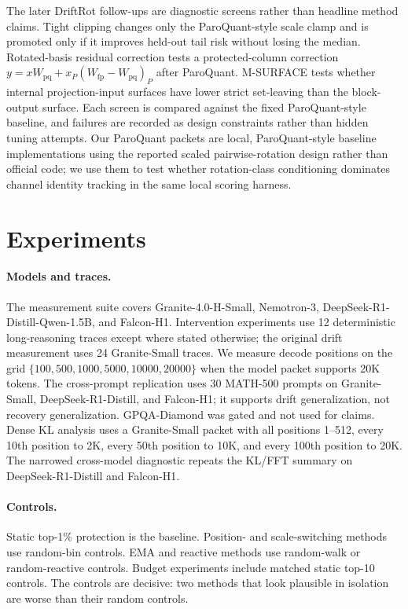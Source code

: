 \documentclass{article}
\begin{document}
The later DriftRot follow-ups are diagnostic screens rather than headline method claims. Tight clipping changes only the ParoQuant-style scale clamp and is promoted only if it improves held-out tail risk without losing the median. Rotated-basis residual correction tests a protected-column correction $y=xW_{\mathrm{pq}}+x_P(W_{\mathrm{fp}}-W_{\mathrm{pq}})_P$ after ParoQuant. M-SURFACE tests whether internal projection-input surfaces have lower strict set-leaving than the block-output surface. Each screen is compared against the fixed ParoQuant-style baseline, and failures are recorded as design constraints rather than hidden tuning attempts. Our ParoQuant packets are local, ParoQuant-style baseline implementations using the reported scaled pairwise-rotation design rather than official code; we use them to test whether rotation-class conditioning dominates channel identity tracking in the same local scoring harness.

\section{Experiments}

\paragraph{Models and traces.} The measurement suite covers Granite-4.0-H-Small, Nemotron-3, DeepSeek-R1-Distill-Qwen-1.5B, and Falcon-H1. Intervention experiments use 12 deterministic long-reasoning traces except where stated otherwise; the original drift measurement uses 24 Granite-Small traces. We measure decode positions on the grid $\{100,500,1000,5000,10000,20000\}$ when the model packet supports 20K tokens. The cross-prompt replication uses 30 MATH-500 prompts on Granite-Small, DeepSeek-R1-Distill, and Falcon-H1; it supports drift generalization, not recovery generalization. GPQA-Diamond was gated and not used for claims. Dense KL analysis uses a Granite-Small packet with all positions 1--512, every 10th position to 2K, every 50th position to 10K, and every 100th position to 20K. The narrowed cross-model diagnostic repeats the KL/FFT summary on DeepSeek-R1-Distill and Falcon-H1.

\paragraph{Controls.} Static top-1\% protection is the baseline. Position- and scale-switching methods use random-bin controls. EMA and reactive methods use random-walk or random-reactive controls. Budget experiments include matched static top-10 controls. The controls are decisive: two methods that look plausible in isolation are worse than their random controls.
\end{document}
